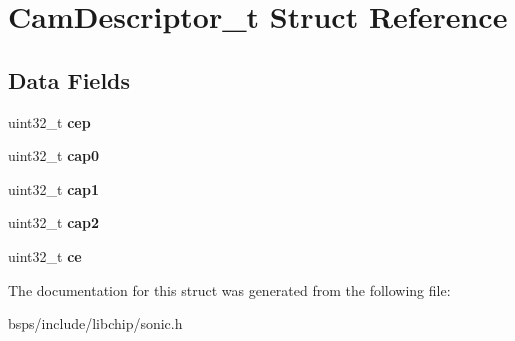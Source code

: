 \hypertarget{structCamDescriptor__t}{}\section{Cam\+Descriptor\+\_\+t Struct Reference}
\label{structCamDescriptor__t}
\subsection*{Data Fields}
\begin{DoxyCompactItemize}
\item 
\mbox{\label{structCamDescriptor__t_ac6a62c5a5a73a3a226d0539ebe8ff570}} 
uint32\+\_\+t {\bfseries cep}
\item 
\mbox{\label{structCamDescriptor__t_a36870a97f9c01efb14eb6dc80235b951}} 
uint32\+\_\+t {\bfseries cap0}
\item 
\mbox{\label{structCamDescriptor__t_a9809dc9025d994e68a0f592925cb7ef7}} 
uint32\+\_\+t {\bfseries cap1}
\item 
\mbox{\label{structCamDescriptor__t_a6fba76bde594b4522540681ed54d60cb}} 
uint32\+\_\+t {\bfseries cap2}
\item 
\mbox{\label{structCamDescriptor__t_a78b3530b5da710d3711c5bcdedb49d93}} 
uint32\+\_\+t {\bfseries ce}
\end{DoxyCompactItemize}


The documentation for this struct was generated from the following file\+:\begin{DoxyCompactItemize}
\item 
bsps/include/libchip/sonic.\+h\end{DoxyCompactItemize}
